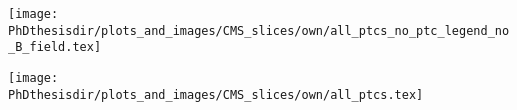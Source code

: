 \begin{frame}
\addtocounter{framenumber}{-1}
\transwipe
{}
\begin{center}
\texttt{[image: \\PhDthesisdir/plots\_and\_images/CMS\_slices/own/all\_ptcs\_no\_ptc\_legend\_no\_B\_field.tex]}
\end{center}
\end{frame}

\begin{frame}
\addtocounter{framenumber}{-1}
\transdissolve
\begin{center}
\texttt{[image: \\PhDthesisdir/plots\_and\_images/CMS\_slices/own/all\_ptcs.tex]}
\end{center}
\end{frame}